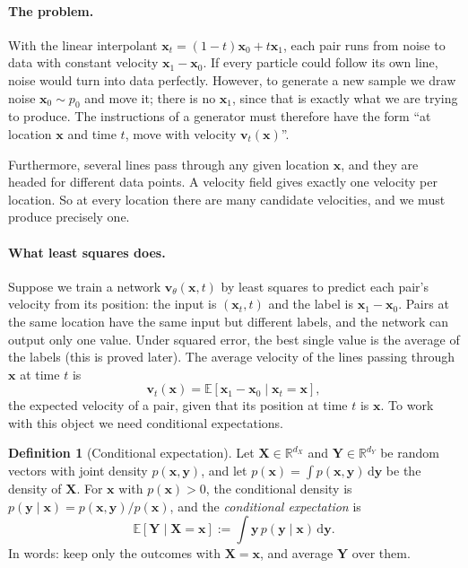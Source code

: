 \documentclass[11pt,a4paper]{article}
\numberwithin{equation}{section}     %
\theoremstyle{plain}        %
\theoremstyle{definition}   %
\newtheorem{definition}[theorem]{Definition}
\theoremstyle{remark}       %
\begin{document}
\paragraph{The problem.} With the linear interpolant $\mathbf{x}_t=(1-t)\mathbf{x}_0+t\mathbf{x}_1$, each pair runs from noise to data with constant velocity $\mathbf{x}_1-\mathbf{x}_0$. If every particle could follow its own line, noise would turn into data perfectly. However, to generate a new sample we draw noise $\mathbf{x}_0\sim p_0$ and move it; there is no $\mathbf{x}_1$, since that is exactly what we are trying to produce. The instructions of a generator must therefore have the form ``at location $\mathbf{x}$ and time $t$, move with velocity $\mathbf{v}_t(\mathbf{x})$''.

Furthermore, several lines pass through any given location $\mathbf{x}$, and they are headed for different data points. A velocity field gives exactly one velocity per location. So at every location there are many candidate velocities, and we must produce precisely one.

\paragraph{What least squares does.} Suppose we train a network $\mathbf{v}_\theta(\mathbf{x},t)$ by least squares to predict each pair's velocity from its position: the input is $(\mathbf{x}_t,t)$ and the label is $\mathbf{x}_1-\mathbf{x}_0$. Pairs at the same location have the same input but different labels, and the network can output only one value. Under squared error, the best single value is the average of the labels (this is proved later). The average velocity of the lines passing through $\mathbf{x}$ at time $t$ is
\[
\mathbf{v}_t(\mathbf{x})=\mathbb{E}\left[\mathbf{x}_1-\mathbf{x}_0\mid\mathbf{x}_t=\mathbf{x}\right],
\]
the expected velocity of a pair, given that its position at time $t$ is $\mathbf{x}$. To work with this object we need conditional expectations.

\begin{definition}[Conditional expectation]\label{def:condexp}
Let $\mathbf{X}\in\mathbb{R}^{d_X}$ and $\mathbf{Y}\in\mathbb{R}^{d_Y}$ be random vectors with joint density $p(\mathbf{x},\mathbf{y})$, and let $p(\mathbf{x})=\int p(\mathbf{x},\mathbf{y})\,\mathrm{d}\mathbf{y}$ be the density of $\mathbf{X}$. For $\mathbf{x}$ with $p(\mathbf{x})>0$, the conditional density is $p(\mathbf{y}\mid\mathbf{x})=p(\mathbf{x},\mathbf{y})/p(\mathbf{x})$, and the \emph{conditional expectation} is
\[
\mathbb{E}\left[\mathbf{Y}\mid\mathbf{X}=\mathbf{x}\right]:=\int\mathbf{y}\,p(\mathbf{y}\mid\mathbf{x})\,\mathrm{d}\mathbf{y}.
\]
In words: keep only the outcomes with $\mathbf{X}=\mathbf{x}$, and average $\mathbf{Y}$ over them.
\end{definition}
\end{document}
